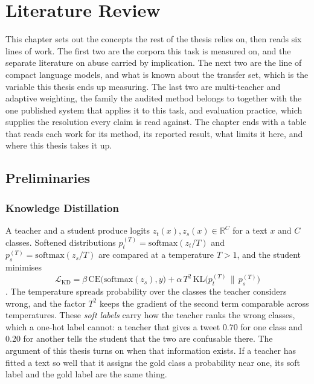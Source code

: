 \chapter{Literature Review}
\label{ch:2}
This chapter sets out the concepts the rest of the thesis relies on, then reads six lines of work.
The first two are the corpora this task is measured on, and the separate literature on abuse carried
by implication. The next two are the line of compact language models, and what is known about the
transfer set, which is the variable this thesis ends up measuring. The last two are multi-teacher
and adaptive weighting, the family the audited method belongs to together with the one published
system that applies it to this task, and evaluation practice, which supplies the resolution every
claim is read against. The chapter ends with a table that reads each work for its method, its
reported result, what limits it here, and where this thesis takes it up.

\section{Preliminaries}
\label{sec:prelim}

\subsection{Knowledge Distillation}
A teacher and a student produce logits $z_t(x), z_s(x) \in \mathbb{R}^C$ for a text $x$ and $C$ classes.
Softened distributions $p^{(T)}_t = \mathrm{softmax}(z_t/T)$ and $p^{(T)}_s = \mathrm{softmax}(z_s/T)$
are compared at a temperature $T > 1$, and the student minimises
\begin{equation}
\mathcal{L}_{\mathrm{KD}} = \beta\, \mathrm{CE}\big(\mathrm{softmax}(z_s), y\big)
 + \alpha\, T^2\, \mathrm{KL}\big(p^{(T)}_t \,\|\, p^{(T)}_s\big)
\end{equation}
\cite{hinton2015distilling}. The temperature spreads probability over the classes the teacher considers
wrong, and the factor $T^2$ keeps the gradient of the second term comparable across temperatures. These
\emph{soft labels} carry how the teacher ranks the wrong classes, which a one-hot label cannot: a teacher
that gives a tweet 0.70 for one class and 0.20 for another tells the student that the two are confusable
there. The argument of this thesis turns on when that information exists. If a teacher has fitted a text
so well that it assigns the gold class a probability near one, its soft label and the gold label are the
same thing.

